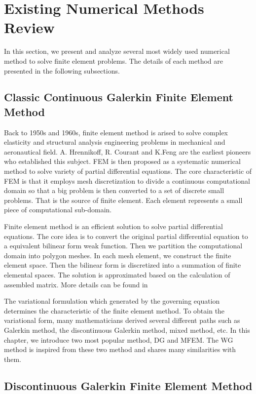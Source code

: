 \section{Existing Numerical Methods Review}
In this section, we present and analyze several most widely used numerical method to solve finite element problems. The details of each method are presented in the following subsections. 
\subsection{Classic Continuous Galerkin Finite Element Method}
Back to 1950s and 1960s, finite element method is arised to solve complex elasticity and structural analysis engineering problems in mechanical and aeronautical field. A. Hrennikoff\cite{hrennikoff1941solution}, R. Courant\cite{courant1994variational} and K.Feng are the earliest pioneers who established this subject. FEM is then proposed as a systematic numerical method to solve variety of partial differential equations. The core characteristic of FEM is that it employs mesh discretization to divide a continuous computational domain so that a big problem is then converted to a set of discrete small problems. That is the source of finite element. Each element represents a small piece of computational sub-domain.

Finite element method is an efficient solution to solve partial differential equations. The core idea is to convert the original partial differential equation to a equivalent bilinear form weak function. Then we partition the computational domain into polygon meshes. In each mesh element, we construct the finite element space. Then the bilinear form is discretized into a summation of finite elemental spaces. The solution is approximated based on the calculation of assembled matrix. More details can be found in \cite{zienkiewicz1977finite, ciarlet2002finite, hughes2012finite, reddy1993introduction}

The variational formulation which generated by the governing equation determines the characteristic of the finite element method. To obtain the variational form, many mathematicians derived several different paths such as Galerkin method, the discontinuous Galerkin method, mixed method, etc. In this chapter, we introduce two most popular method, DG and MFEM. The WG method is inspired from these two method and shares many similarities with them. 

\subsection{Discontinuous Galerkin Finite Element Method}


